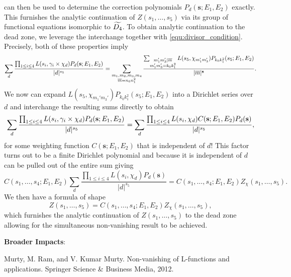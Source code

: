 \documentclass[12pt,reqno,oneside]{amsart}
\begin{document}
can then be used to determine the correction polynomials $P_{d}(\mathbf{s};E_{1},E_{2})$ exactly. This furnishes the analytic continuation of $Z(s_{1},\ldots,s_{5})$ via its group of functional equations isomorphic to $\widetilde{D_{4}}$. To obtain analytic continuation to the dead zone, we leverage the interchange together with \cref{equ:divisor_condition}. Precisely, both of these properties imply
\[
  \sum_{d}\frac{\prod_{1 \le i \le 4}L(s_{i},\gamma_{i} \times \chi_{d})P_{d}(\mathbf{s};E_{1},E_{2})}{|d|^{s_{5}}} = \sum_{\substack{m_{1},m_{2},m_{3},m_{4} \\ \overline{m} = n_{0}n_{1}^{2}}}\frac{\sum_{\substack{m_{1}'m_{3}' \mid \overline{m} \\ m_{1}'m_{3}' = k_{0}k_{1}^{2}}}L(s_{5},\chi_{m_{1}'m_{3}'})P_{k_{0}k_{1}^{2}}(s_{5};E_{1},E_{2})}{|\overline{m}|^{\mathbf{s}}}.
\]
We now can expand $L(s_{5},\chi_{m_{1}'m_{3}'})P_{k_{0}k_{1}^{2}}(s_{5};E_{1},E_{2})$ into a Dirichlet series over $d$ and interchange the resulting sums directly to obtain
\[
  \sum_{d}\frac{\prod_{1 \le i \le 4}L(s_{i},\gamma_{i} \times \chi_{d})P_{d}(\mathbf{s};E_{1},E_{2})}{|d|^{s_{5}}} = \sum_{d}\frac{\prod_{1 \le i \le 4}L(s_{i},\chi_{d})C(\mathbf{s};E_{1},E_{2})P_{d}(\mathbf{s})}{|d|^{s_{5}}},
\]
for some weighting function $C(\mathbf{s};E_{1},E_{2})$ that is independent of $d$! This factor turns out to be a finite Dirichlet polynomial and because it is independent of $d$ can be pulled out of the entire sum giving
\[
  C(s_{1},\ldots,s_{4};E_{1},E_{2})\sum_{d}\frac{\prod_{1 \le i \le 4}L(s_{i},\chi_{d})P_{d}(\mathbf{s})}{|d|^{s_{5}}} = C(s_{1},\ldots,s_{4};E_{1},E_{2})Z_{\chi}(s_{1},\ldots,s_{5}). 
\]
We then have a formula of shape
\[
  Z(s_{1},\ldots,s_{5}) = C(s_{1},\ldots,s_{4};E_{1},E_{2})Z_{\chi}(s_{1},\ldots,s_{5}),
\]
which furnishes the analytic continuation of $Z(s_{1},\ldots,s_{5})$ to the dead zone allowing for the simultaneous non-vanishing result to be achieved. 

\textbf{Broader Impacts}:

\begin{thebibliography}{}
  Murty, M. Ram, and V. Kumar Murty. Non-vanishing of L-functions and applications. Springer Science \& Business Media, 2012.
\end{thebibliography}
\end{document}
